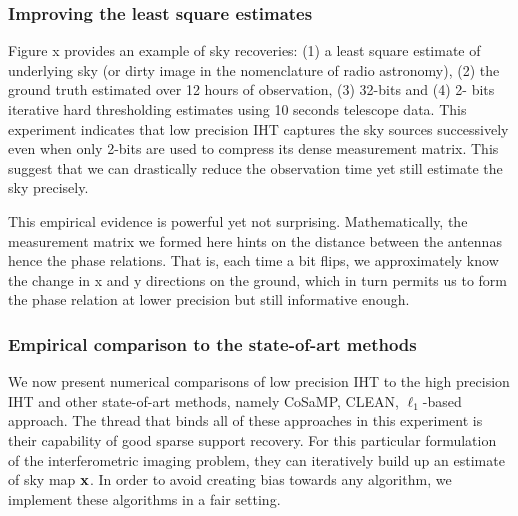 \documentclass{article}
\begin{document}
\subsubsection{Improving the least square estimates}
Figure x provides an example of sky recoveries: (1) a least square estimate of underlying sky (or dirty image in the nomenclature of radio astronomy), (2) the ground truth estimated over 12 hours of observation, (3) 32-bits and (4) 2- bits iterative hard thresholding estimates using 10 seconds telescope data. This experiment indicates that low precision IHT captures the sky sources successively even when only 2-bits are used to compress its dense measurement matrix. This suggest that we can drastically reduce the observation time yet still estimate the sky precisely.





This empirical evidence is powerful yet not surprising. Mathematically, the measurement matrix we formed here hints on the distance between the antennas hence the phase relations. That is, each time a bit flips, we approximately know the change in x and y directions on the ground, which in turn permits us to form the phase relation at lower precision but still informative enough. 


\subsubsection{Empirical comparison to the state-of-art methods}

We now present numerical comparisons of low precision IHT to the high precision IHT and other state-of-art methods, namely CoSaMP, CLEAN, $\ell_1$-based approach. The thread that binds all of these approaches in this experiment is their capability of good sparse support recovery. For this particular formulation of the interferometric imaging problem, they can iteratively build up an estimate of sky map ${\bf x}$. In order to avoid creating bias towards any algorithm, we implement these algorithms in a fair setting.
\end{document}
